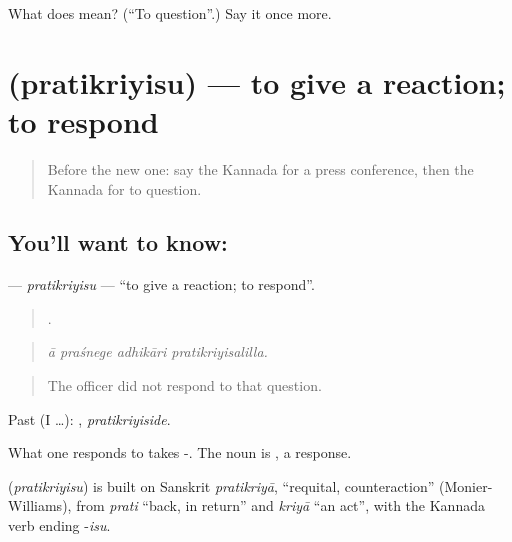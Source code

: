 \begin{tcolorbox}[breakable,colback=teal!4,colframe=teal!35!black,title={Before you move on}]
What does  mean? (\textquotedblleft{}To question\textquotedblright{}.) Say it once more.
\end{tcolorbox}
\section[\texorpdfstring{\kn{ಪ್ರತಿಕ್ರಿಯಿಸು} (pratikriyisu)}{ಪ್ರತಿಕ್ರಿಯಿಸು (pratikriyisu)}]{ (pratikriyisu) — to give a reaction; to respond}

\label{lesson:KA-C347-pratikriyisu}



\begin{quote}
Before the new one: say the Kannada for a press conference, then the Kannada for to question.
\end{quote}

\subsection*{You'll want to know: }
\textbf{} — \emph{pratikriyisu} — \textquotedblleft{}to give a reaction; to respond\textquotedblright{}.

\begin{quote}
   .
\end{quote}

\begin{quote}
\emph{ā praśnege adhikāri pratikriyisalilla.}
\end{quote}

\begin{quote}
The officer did not respond to that question.
\end{quote}

Past (I …): , \emph{pratikriyiside}.

What one responds to takes -. The noun is , a response.

\begin{cousinweb}
\textbf{} (\emph{pratikriyisu}) is built on Sanskrit \emph{pratikriyā}, \textquotedblleft{}requital, counteraction\textquotedblright{} (Monier-Williams), from \emph{prati} \textquotedblleft{}back, in return\textquotedblright{} and \emph{kriyā} \textquotedblleft{}an act\textquotedblright{}, with the Kannada verb ending -\emph{isu}.
\end{cousinweb}

